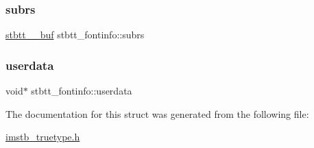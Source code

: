 \subsubsection{\texorpdfstring{subrs}{subrs}}
{\footnotesize\ttfamily \mbox{\hyperlink{structstbtt____buf}{stbtt\+\_\+\+\_\+buf}} stbtt\+\_\+fontinfo\+::subrs}

\mbox{\label{structstbtt__fontinfo_a9c81078df96a7a3f730137151efab285}} 
\subsubsection{\texorpdfstring{userdata}{userdata}}
{\footnotesize\ttfamily void$\ast$ stbtt\+\_\+fontinfo\+::userdata}



The documentation for this struct was generated from the following file\+:\begin{DoxyCompactItemize}
\item 
\mbox{\hyperlink{imstb__truetype_8h}{imstb\+\_\+truetype.\+h}}\end{DoxyCompactItemize}
